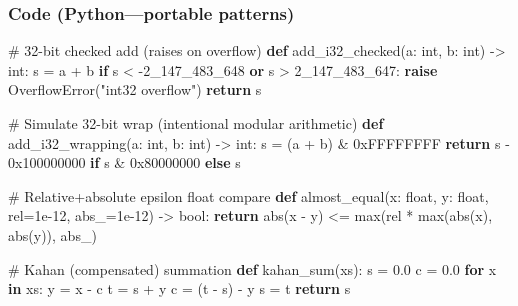 \documentclass[
  letterpaper,
  DIV=11,
  numbers=noendperiod]{scrreprt}
\newenvironment{Shaded}{\begin{snugshade}}{\end{snugshade}}
\newcommand{\BaseNTok}[1]{\textcolor[rgb]{0.68,0.00,0.00}{#1}}
\newcommand{\BuiltInTok}[1]{\textcolor[rgb]{0.00,0.23,0.31}{#1}}
\newcommand{\CommentTok}[1]{\textcolor[rgb]{0.37,0.37,0.37}{#1}}
\newcommand{\ControlFlowTok}[1]{\textcolor[rgb]{0.00,0.23,0.31}{\textbf{#1}}}
\newcommand{\DecValTok}[1]{\textcolor[rgb]{0.68,0.00,0.00}{#1}}
\newcommand{\FloatTok}[1]{\textcolor[rgb]{0.68,0.00,0.00}{#1}}
\newcommand{\KeywordTok}[1]{\textcolor[rgb]{0.00,0.23,0.31}{\textbf{#1}}}
\newcommand{\NormalTok}[1]{\textcolor[rgb]{0.00,0.23,0.31}{#1}}
\newcommand{\OperatorTok}[1]{\textcolor[rgb]{0.37,0.37,0.37}{#1}}
\newcommand{\PreprocessorTok}[1]{\textcolor[rgb]{0.68,0.00,0.00}{#1}}
\newcommand{\StringTok}[1]{\textcolor[rgb]{0.13,0.47,0.30}{#1}}
\begin{document}
\subsubsection{Code (Python---portable
patterns)}\label{code-pythonportable-patterns}

\begin{Shaded}
\begin{Highlighting}[]
\CommentTok{\# 32{-}bit checked add (raises on overflow)}
\KeywordTok{def}\NormalTok{ add\_i32\_checked(a: }\BuiltInTok{int}\NormalTok{, b: }\BuiltInTok{int}\NormalTok{) }\OperatorTok{{-}\textgreater{}} \BuiltInTok{int}\NormalTok{:}
\NormalTok{    s }\OperatorTok{=}\NormalTok{ a }\OperatorTok{+}\NormalTok{ b}
    \ControlFlowTok{if}\NormalTok{ s }\OperatorTok{\textless{}} \OperatorTok{{-}}\DecValTok{2\_147\_483\_648} \KeywordTok{or}\NormalTok{ s }\OperatorTok{\textgreater{}} \DecValTok{2\_147\_483\_647}\NormalTok{:}
        \ControlFlowTok{raise} \PreprocessorTok{OverflowError}\NormalTok{(}\StringTok{"int32 overflow"}\NormalTok{)}
    \ControlFlowTok{return}\NormalTok{ s}

\CommentTok{\# Simulate 32{-}bit wrap (intentional modular arithmetic)}
\KeywordTok{def}\NormalTok{ add\_i32\_wrapping(a: }\BuiltInTok{int}\NormalTok{, b: }\BuiltInTok{int}\NormalTok{) }\OperatorTok{{-}\textgreater{}} \BuiltInTok{int}\NormalTok{:}
\NormalTok{    s }\OperatorTok{=}\NormalTok{ (a }\OperatorTok{+}\NormalTok{ b) }\OperatorTok{\&} \BaseNTok{0xFFFFFFFF}
    \ControlFlowTok{return}\NormalTok{ s }\OperatorTok{{-}} \BaseNTok{0x100000000} \ControlFlowTok{if}\NormalTok{ s }\OperatorTok{\&} \BaseNTok{0x80000000} \ControlFlowTok{else}\NormalTok{ s}

\CommentTok{\# Relative+absolute epsilon float compare}
\KeywordTok{def}\NormalTok{ almost\_equal(x: }\BuiltInTok{float}\NormalTok{, y: }\BuiltInTok{float}\NormalTok{, rel}\OperatorTok{=}\FloatTok{1e{-}12}\NormalTok{, abs\_}\OperatorTok{=}\FloatTok{1e{-}12}\NormalTok{) }\OperatorTok{{-}\textgreater{}} \BuiltInTok{bool}\NormalTok{:}
    \ControlFlowTok{return} \BuiltInTok{abs}\NormalTok{(x }\OperatorTok{{-}}\NormalTok{ y) }\OperatorTok{\textless{}=} \BuiltInTok{max}\NormalTok{(rel }\OperatorTok{*} \BuiltInTok{max}\NormalTok{(}\BuiltInTok{abs}\NormalTok{(x), }\BuiltInTok{abs}\NormalTok{(y)), abs\_)}

\CommentTok{\# Kahan (compensated) summation}
\KeywordTok{def}\NormalTok{ kahan\_sum(xs):}
\NormalTok{    s }\OperatorTok{=} \FloatTok{0.0}
\NormalTok{    c }\OperatorTok{=} \FloatTok{0.0}
    \ControlFlowTok{for}\NormalTok{ x }\KeywordTok{in}\NormalTok{ xs:}
\NormalTok{        y }\OperatorTok{=}\NormalTok{ x }\OperatorTok{{-}}\NormalTok{ c}
\NormalTok{        t }\OperatorTok{=}\NormalTok{ s }\OperatorTok{+}\NormalTok{ y}
\NormalTok{        c }\OperatorTok{=}\NormalTok{ (t }\OperatorTok{{-}}\NormalTok{ s) }\OperatorTok{{-}}\NormalTok{ y}
\NormalTok{        s }\OperatorTok{=}\NormalTok{ t}
    \ControlFlowTok{return}\NormalTok{ s}


\end{Highlighting}
\end{Shaded}
\end{document}
